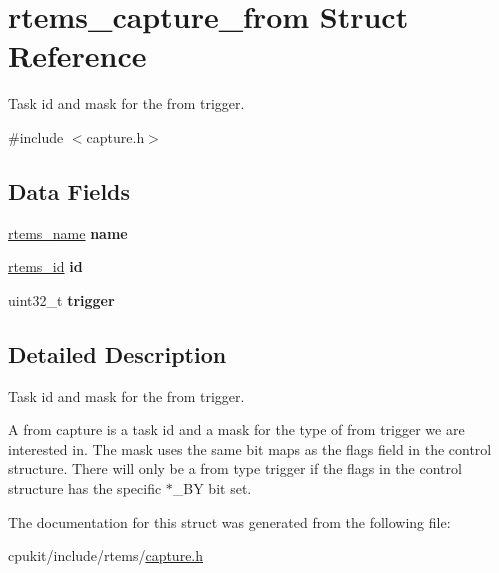 \hypertarget{structrtems__capture__from}{}\section{rtems\+\_\+capture\+\_\+from Struct Reference}
\label{structrtems__capture__from}


Task id and mask for the from trigger.  




{\ttfamily \#include $<$capture.\+h$>$}

\subsection*{Data Fields}
\begin{DoxyCompactItemize}
\item 
\mbox{\label{structrtems__capture__from_a8f4cd283f8d033ff1b174df0724f7fa4}} 
\mbox{\hyperlink{group__ClassicTasks_ga55fb63c49f68c0cbd9bee004da15b1fd}{rtems\+\_\+name}} {\bfseries name}
\item 
\mbox{\label{structrtems__capture__from_a53a5a7b1025e6932b16856a61433d68f}} 
\mbox{\hyperlink{group__ClassicTasks_gab20892b814dced7dd4e5b9bf42becd57}{rtems\+\_\+id}} {\bfseries id}
\item 
\mbox{\label{structrtems__capture__from_a733ea7ff47c839df032b3811234b74d4}} 
uint32\+\_\+t {\bfseries trigger}
\end{DoxyCompactItemize}


\subsection{Detailed Description}
Task id and mask for the from trigger. 

A from capture is a task id and a mask for the type of from trigger we are interested in. The mask uses the same bit maps as the flags field in the control structure. There will only be a from type trigger if the flags in the control structure has the specific $\ast$\+\_\+\+BY bit set. 

The documentation for this struct was generated from the following file\+:\begin{DoxyCompactItemize}
\item 
cpukit/include/rtems/\mbox{\hyperlink{capture_8h}{capture.\+h}}\end{DoxyCompactItemize}
